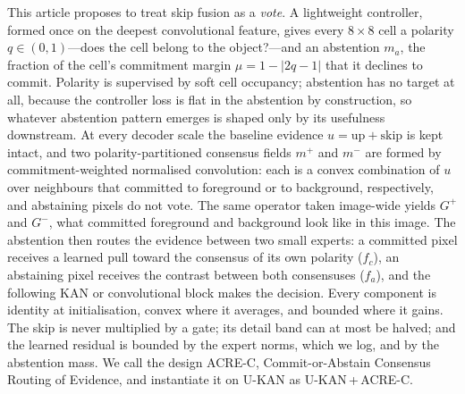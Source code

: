 This article proposes to treat skip fusion as a \emph{vote}. A lightweight controller, formed once on the deepest convolutional feature, gives every $8\times8$ cell a polarity $q\in(0,1)$---does the cell belong to the object?---and an abstention $m_a$, the fraction of the cell's commitment margin $\mu = 1-|2q-1|$ that it declines to commit. Polarity is supervised by soft cell occupancy; abstention has no target at all, because the controller loss is flat in the abstention by construction, so whatever abstention pattern emerges is shaped only by its usefulness downstream. At every decoder scale the baseline evidence $u = \mathrm{up} + \mathrm{skip}$ is kept intact, and two polarity-partitioned consensus fields $m^{+}$ and $m^{-}$ are formed by commitment-weighted normalised convolution: each is a convex combination of $u$ over neighbours that committed to foreground or to background, respectively, and abstaining pixels do not vote. The same operator taken image-wide yields $G^{+}$ and $G^{-}$, what committed foreground and background look like in this image. The abstention then routes the evidence between two small experts: a committed pixel receives a learned pull toward the consensus of its own polarity ($f_c$), an abstaining pixel receives the contrast between both consensuses ($f_a$), and the following KAN or convolutional block makes the decision. Every component is identity at initialisation, convex where it averages, and bounded where it gains. The skip is never multiplied by a gate; its detail band can at most be halved; and the learned residual is bounded by the expert norms, which we log, and by the abstention mass. We call the design ACRE-C, Commit-or-Abstain Consensus Routing of Evidence, and instantiate it on U-KAN as U-KAN\,+\,ACRE-C.

